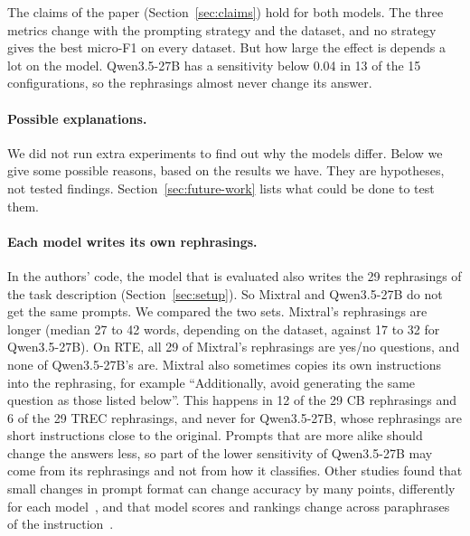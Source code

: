The claims of the paper (Section~\ref{sec:claims}) hold for both models. The
three metrics change with the prompting strategy and the dataset, and no
strategy gives the best micro-F1 on every dataset. But how large the effect
is depends a lot on the model. Qwen3.5-27B has a sensitivity below 0.04 in 13
of the 15 configurations, so the rephrasings almost never change its answer.

\paragraph{Possible explanations.}
We did not run extra experiments to find out why the models differ. Below we
give some possible reasons, based on the results we have. They are
hypotheses, not tested findings. Section~\ref{sec:future-work} lists what
could be done to test them.

\paragraph{Each model writes its own rephrasings.}
In the authors' code, the model that is evaluated also writes the 29
rephrasings of the task description (Section~\ref{sec:setup}). So Mixtral and
Qwen3.5-27B do not get the same prompts. We compared the two sets. Mixtral's
rephrasings are longer (median 27 to 42 words, depending on the dataset,
against 17 to 32 for Qwen3.5-27B). On RTE, all 29 of Mixtral's rephrasings
are yes/no questions, and none of Qwen3.5-27B's are. Mixtral also sometimes
copies its own instructions into the rephrasing, for example ``Additionally,
avoid generating the same question as those listed below''. This happens in
12 of the 29 CB rephrasings and 6 of the 29 TREC rephrasings, and never for
Qwen3.5-27B, whose rephrasings are short instructions close to the original.
Prompts that are more alike should change the answers less, so part of the
lower sensitivity of Qwen3.5-27B may come from its rephrasings and not from
how it classifies. Other studies found that small changes in prompt format
can change accuracy by many points, differently for each
model~\cite{Sclar:2024}, and that model scores and rankings change across
paraphrases of the instruction~\cite{Mizrahi:2024}.

